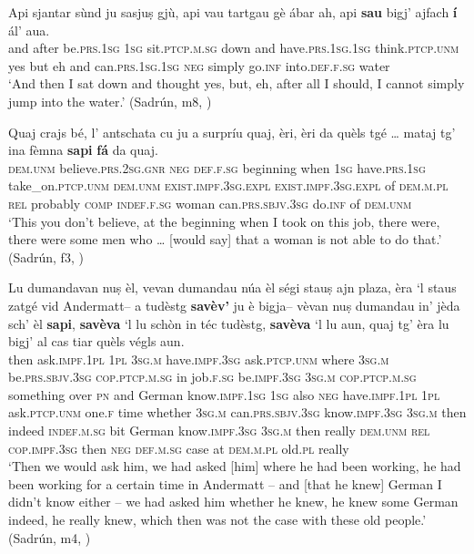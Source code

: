 \ea
\label{ex:savaj4}
\gll  Api sjantar sùnd ju sasjuṣ gjù, api vau tartgau gè ábar ah, api \textbf{sau} bigj’ ajfach \textbf{í} ál’ aua.\\
and after be.\textsc{prs.1sg} \textsc{1sg} sit.\textsc{ptcp.m.sg} down and have.\textsc{prs.1sg.1sg} think.\textsc{ptcp.unm} yes but eh and can.\textsc{prs.1sg.1sg} \textsc{neg} simply go.\textsc{inf} into.\textsc{def.f.sg} water\\
\glt `And then I sat down and thought yes, but, eh, after all I should, I cannot simply jump into the water.' (Sadrún, m8, )
\z                                       

\ea
\label{ex:savaj5}
\gll  Quaj crajs bé, l’ antschata cu ju a surpríu quaj, èri, èri da quèls tgé … mataj\footnotemark{} tg’ ina fèmna \textbf{sapi} \textbf{fá} da quaj.\\
\textsc{dem.unm} believe.\textsc{prs.2sg.gnr} \textsc{neg} \textsc{def.f.sg} beginning when \textsc{1sg} have.\textsc{prs.1sg} take\_on.\textsc{ptcp.unm} \textsc{dem.unm} \textsc{exist.impf.3sg.expl} \textsc{exist.impf.3sg.expl} of \textsc{dem.m.pl} \textsc{rel} {} probably \textsc{comp} \textsc{indef.f.sg} woman can.\textsc{prs.sbjv.3sg} do.\textsc{inf} of \textsc{dem.unm}\\
\glt `This you don’t believe, at the beginning when I took on this job, there were, there were some men who … [would say] that a woman is not able to do that.' (Sadrún, f3, )
\z

\ea
\label{ex:savaj6}
\gll Lu dumandavan nuṣ èl, vevan dumandau núa èl ségi stauṣ ajn plaza, èra `l staus zatgé vid Andermatt– a tudèstg \textbf{savèv’} ju è bigja– vèvan nuṣ dumandau in' jèda sch’ èl \textbf{sapi}, \textbf{savèva} `l lu schòn in téc tudèstg, \textbf{savèva} `l lu aun, quaj tg’ èra lu bigj' al cas tiar quèls végls aun.   \\
then ask.\textsc{impf.1pl} \textsc{1pl} \textsc{3sg.m} have.\textsc{impf.3sg}  ask.\textsc{ptcp.unm} where \textsc{3sg.m} be.\textsc{prs.sbjv.3sg} \textsc{cop.ptcp.m.sg} in job.\textsc{f.sg} be.\textsc{impf.3sg} \textsc{3sg.m}  \textsc{cop.ptcp.m.sg} something over \textsc{pn} and German know.\textsc{impf.1sg} \textsc{1sg} also \textsc{neg} have.\textsc{impf.1pl} \textsc{1pl} ask.\textsc{ptcp.unm} one.\textsc{f} time whether \textsc{3sg.m} can.\textsc{prs.sbjv.3sg} know.\textsc{impf.3sg} \textsc{3sg.m} then indeed \textsc{indef.m.sg} bit German know.\textsc{impf.3sg} \textsc{3sg.m} then really \textsc{dem.unm} \textsc{rel} \textsc{cop.impf.3sg} then \textsc{neg} \textsc{def.m.sg} case at \textsc{dem.m.pl} old.\textsc{pl} really \\
\glt `Then we would ask him, we had asked [him] where he had been working, he had been working for a certain time in Andermatt – and [that he knew] German I didn't know either – we had asked him whether he knew, he knew some German indeed, he really knew, which then was not the case with these old people.' (Sadrún, m4, )
\z

